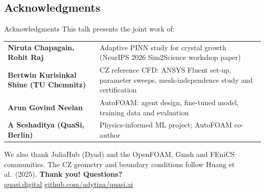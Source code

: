 \documentclass[aspectratio=169,10pt,t]{beamer}
\newcommand{\weblink}[2]{\href{#1}{\textcolor{qblue}{#2}}}
\begin{document}
\begin{frame}
\section{Acknowledgments}
\begin{frame}{Acknowledgments}
\small This talk presents the joint work of:\\[2mm]
\renewcommand{\arraystretch}{1.3}
\begin{tabularx}{\textwidth}{@{}>{\bfseries}l L@{}}
\toprule
Niruta Chapagain, Rohit Raj & Adaptive PINN study for crystal growth (NeurIPS 2026 Sim2Science workshop paper) \\
Bertwin Kurisinkal Shine (TU Chemnitz) & CZ reference CFD: ANSYS Fluent set-up, parameter sweeps, mesh-independence study and certification \\
Arun Govind Neelan & AutoFOAM: agent design, fine-tuned model, training data and evaluation \\
A Seshaditya (QuaSi, Berlin) & Physics-informed ML project; AutoFOAM co-author \\
\bottomrule
\end{tabularx}
\vspace{2mm}

\footnotesize We also thank JuliaHub (Dyad) and the OpenFOAM, Gmsh and FEniCS communities. The CZ geometry and boundary conditions follow Huang et al.\ (2025).
\vfill
\centering
{\Large\textcolor{qblue}{\textbf{Thank you! Questions?}}}\\[1mm]
\footnotesize\weblink{https://quasi.digital}{quasi.digital}\quad
\weblink{https://github.com/adytiaa/quasi.ai}{github.com/adytiaa/quasi.ai}
\vspace{2mm}
\end{frame}


\end{frame}
\end{document}
